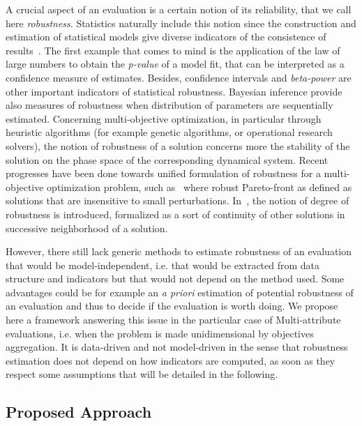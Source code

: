 \documentclass[runningheads,a4paper]{llncs2e/llncs}
\begin{document}
A crucial aspect of an evaluation is a certain notion of its reliability, that we call here \emph{robustness}. %
Statistics naturally include this notion since the construction and estimation of statistical models give diverse indicators of the consistence of results~\cite{launer2014robustness}. The first example that comes to mind is the application of the law of large numbers to obtain the \emph{p-value} of a model fit, that can be interpreted as a confidence measure of estimates. Besides, confidence intervals and \emph{beta-power} are other important indicators of statistical robustness. Bayesian inference provide also measures of robustness when distribution of parameters are sequentially estimated. Concerning multi-objective optimization, in particular through heuristic algorithms (for example genetic algorithms, or operational research solvers), the notion of robustness of a solution concerns more the stability of the solution on the phase space of the corresponding dynamical system. Recent progresses have been done towards unified formulation of robustness for a multi-objective optimization problem, such as~\cite{deb2006introducing} where robust Pareto-front as defined as solutions that are insensitive to small perturbations. In~\cite{1688537}, the notion of degree of robustness is introduced, formalized as a sort of continuity of other solutions in successive neighborhood of a solution.

However, there still lack generic methods to estimate robustness of an evaluation that would be model-independent, i.e. that would be extracted from data structure and indicators but that would not depend on the method used. Some advantages could be for example an \emph{a priori} estimation of potential robustness of an evaluation and thus to decide if the evaluation is worth doing. We propose here a framework answering this issue in the particular case of Multi-attribute evaluations, i.e. when the problem is made unidimensional by objectives aggregation. It is data-driven and not model-driven in the sense that robustness estimation does not depend on how indicators are computed, as soon as they respect some assumptions that will be detailed in the following.


\subsection{Proposed Approach}
\end{document}
